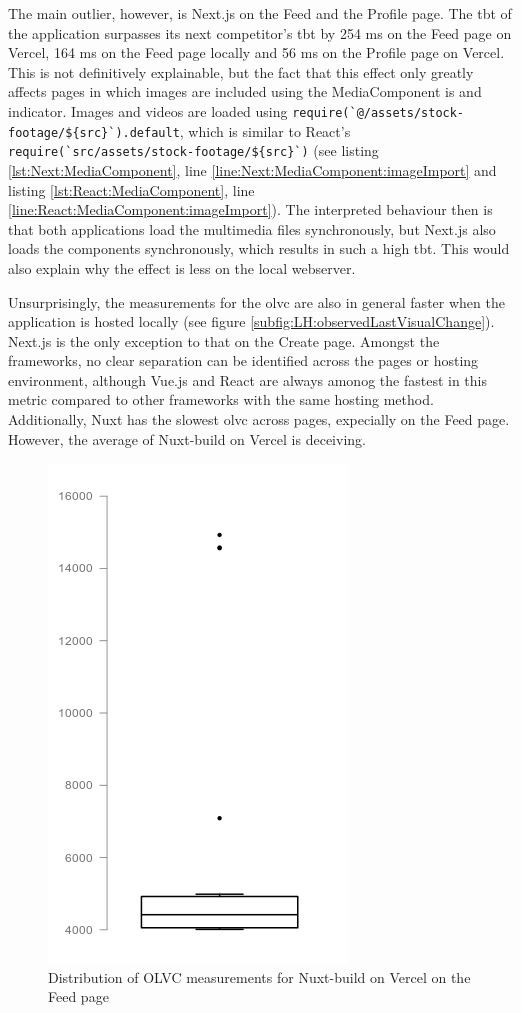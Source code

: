 \documentclass[a4paper, 10pt]{article}
\begin{document}
The main outlier, however, is Next.js on the Feed and the Profile page.
The \acrshort{tbt} of the application surpasses its next competitor's \acrshort{tbt} by 254 ms on the Feed page on Vercel, 164 ms on the Feed page locally and 56 ms on the Profile page on Vercel.
This is not definitively explainable, but the fact that this effect only greatly affects pages in which images are included using the MediaComponent is and indicator.
Images and videos are loaded using \lstinline|require(`@/assets/stock-footage/${src}`).default|, which is similar to React's \lstinline|require(`src/assets/stock-footage/${src}`)| (see listing \ref{lst:Next:MediaComponent}, line \ref{line:Next:MediaComponent:imageImport} and listing \ref{lst:React:MediaComponent}, line \ref{line:React:MediaComponent:imageImport}).
The interpreted behaviour then is that both applications load the multimedia files synchronously, but Next.js also loads the components synchronously, which results in such a high \acrlong{tbt}.
This would also explain why the effect is less on the local webserver.

Unsurprisingly, the measurements for the \acrfull{olvc} are also in general faster when the application is hosted locally (see figure \ref{subfig:LH:observedLastVisualChange}).
Next.js is the only exception to that on the Create page.
Amongst the frameworks, no clear separation can be identified across the pages or hosting environment, although Vue.js and React are always amonog the fastest in this metric compared to other frameworks with the same hosting method.
Additionally, Nuxt has the slowest \acrshort{olvc} across pages, expecially on the Feed page.
However, the average of Nuxt-build on Vercel is deceiving.

\begin{figure}
  \centering
  \includegraphics[width=0.5\linewidth, keepaspectratio]{img/box-plot-image.png}
  \caption{Distribution of OLVC measurements for Nuxt-build on Vercel on the Feed page}
  \label{fig:olvc-distribution}
\end{figure}
\end{document}
